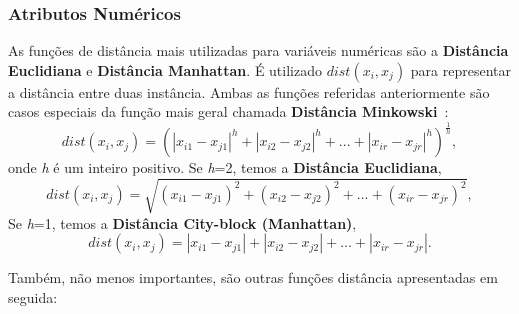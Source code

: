 \subsubsection{Atributos Numéricos} \label{subsubsec: attrnum}

As funções de distância mais utilizadas para variáveis numéricas são a \textbf{Distância Euclidiana} e \textbf{Distância Manhattan}. É utilizado $ dist(x_{i}, x_{j}) $ para representar a distância entre duas instância. Ambas as funções referidas anteriormente são casos especiais da função mais geral chamada \textbf{Distância Minkowski}~\citet{Liu2011}:
\begin{equation}
dist(x_{i}, x_{j}) = (|x_{i1} - x_{j1}|^h + |x_{i2} - x_{j2}|^h +...+ |x_{ir} - x_{jr}|^h)^\frac{1}{h},
\label{eq:mink}
\end{equation}
onde \textit{h} é um inteiro positivo. Se \textit{h}=2, temos a \textbf{Distância Euclidiana},
\begin{equation} 
dist(x_{i}, x_{j}) = \sqrt{(x_{i1} - x_{j1})^2 + (x_{i2} - x_{j2})^2 +...+ (x_{ir} - x_{jr})^2},
\label{eq: euclid}
\end{equation}
Se \textit{h}=1, temos a \textbf{Distância City-block (Manhattan)},
\begin{equation}
dist(x_{i}, x_{j}) = |x_{i1} - x_{j1}| + |x_{i2} - x_{j2}| +...+ |x_{ir} - x_{jr}|.
\label{eq: manhattan}
\end{equation}

Também, não menos importantes, são outras funções distância apresentadas em seguida:

